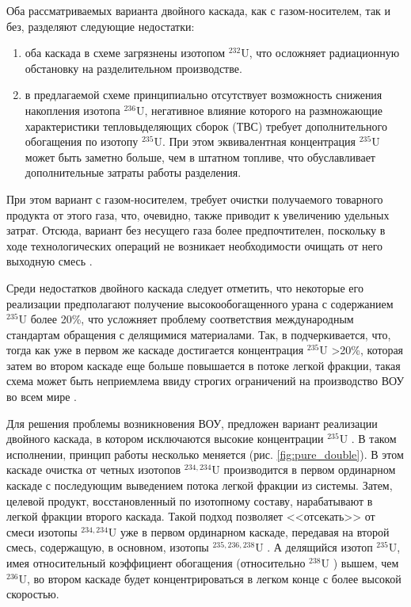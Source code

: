 Оба рассматриваемых варианта двойного каскада, как с газом-носителем, так и без, разделяют следующие недостатки:
\begin{enumerate}
  \item оба каскада в схеме загрязнены изотопом $^{232}$U, что осложняет радиационную обстановку на разделительном производстве.
  \item в предлагаемой схеме принципиально отсутствует возможность снижения накопления изотопа $^{236}$U, негативное влияние которого на размножающие характеристики тепловыделяющих сборок (ТВС) требует дополнительного обогащения по изотопу $^{235}$U. При этом эквивалентная концентрация $^{235}$U может быть заметно больше, чем в штатном топливе, что обуславливает дополнительные затраты работы разделения.
\end{enumerate}

При этом вариант с газом-носителем, требует очистки получаемого товарного продукта от этого газа, что, очевидно, также приводит к увеличению удельных затрат. Отсюда, вариант без несущего газа более предпочтителен, поскольку в ходе технологических операций не возникает необходимости очищать от него выходную смесь \cite{smirnovKaskadnyeShemyZadachah2012}.

Среди недостатков двойного каскада следует отметить, что некоторые его реализации предполагают получение высокообогащенного урана с содержанием $^{235}$U более 20\%, что усложняет проблему соответствия международным стандартам обращения с делящимися материалами.
Так, в \cite{palkinPurificationReprocessedUranium2016} подчеркивается, что, тогда как уже в первом же каскаде достигается концентрация $^{235}$U >20\%, которая затем во втором каскаде еще больше повышается в потоке легкой фракции, такая схема может быть неприемлема ввиду строгих ограничений на производство ВОУ во всем мире \cite{ManagementHighEnriched2005}.

Для решения проблемы возникновения ВОУ, предложен вариант реализации двойного каскада, в котором исключаются высокие концентрации $^{235}$U \cite{zhurinSposobIzotopnogoVosstanovleniya2010}. В таком исполнении, принцип работы несколько меняется (рис. \ref{fig:pure_double}).
В этом каскаде очистка от четных изотопов $^{234,234}$U производится в первом ординарном каскаде с последующим выведением потока легкой фракции из системы. Затем, целевой продукт, восстановленный по изотопному составу, нарабатывают в легкой фракции второго каскада. Такой подход позволяет <<отсекать>> от смеси изотопы $^{234,234}$U уже в первом ординарном каскаде, передавая на второй смесь, содержащую, в основном, изотопы $^{235,236,238}$U \cite{borodynyaIssledovanieProblemyVovlecheniya1989}. А делящийся изотоп $^{235}$U, имея относительный коэффициент обогащения (относительно $^{238}$U ) вышем, чем $^{236}$U, во втором каскаде будет концентрироваться в легком конце с более высокой скоростью.

